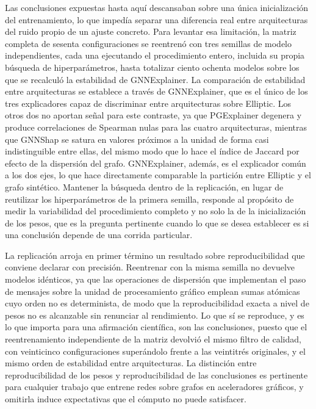 Las conclusiones expuestas hasta aquí descansaban sobre una única inicialización del entrenamiento, lo que impedía separar una diferencia real entre arquitecturas del ruido propio de un ajuste concreto. Para levantar esa limitación, la matriz completa de sesenta configuraciones se reentrenó con tres semillas de modelo independientes, cada una ejecutando el procedimiento entero, incluida su propia búsqueda de hiperparámetros, hasta totalizar ciento ochenta modelos sobre los que se recalculó la estabilidad de GNNExplainer. La comparación de estabilidad entre arquitecturas se establece a través de GNNExplainer, que es el único de los tres explicadores capaz de discriminar entre arquitecturas sobre Elliptic. Los otros dos no aportan señal para este contraste, ya que PGExplainer degenera y produce correlaciones de Spearman nulas para las cuatro arquitecturas, mientras que GNNShap se satura en valores próximos a la unidad de forma casi indistinguible entre ellas, del mismo modo que lo hace el índice de Jaccard por efecto de la dispersión del grafo. GNNExplainer, además, es el explicador común a los dos ejes, lo que hace directamente comparable la partición entre Elliptic y el grafo sintético. Mantener la búsqueda dentro de la replicación, en lugar de reutilizar los hiperparámetros de la primera semilla, responde al propósito de medir la variabilidad del procedimiento completo y no solo la de la inicialización de los pesos, que es la pregunta pertinente cuando lo que se desea establecer es si una conclusión depende de una corrida particular.

La replicación arroja en primer término un resultado sobre reproducibilidad que conviene declarar con precisión. Reentrenar con la misma semilla no devuelve modelos idénticos, ya que las operaciones de dispersión que implementan el paso de mensajes sobre la unidad de procesamiento gráfico emplean sumas atómicas cuyo orden no es determinista, de modo que la reproducibilidad exacta a nivel de pesos no es alcanzable sin renunciar al rendimiento. Lo que sí se reproduce, y es lo que importa para una afirmación científica, son las conclusiones, puesto que el reentrenamiento independiente de la matriz devolvió el mismo filtro de calidad, con veinticinco configuraciones superándolo frente a las veintitrés originales, y el mismo orden de estabilidad entre arquitecturas. La distinción entre reproducibilidad de los pesos y reproducibilidad de las conclusiones es pertinente para cualquier trabajo que entrene redes sobre grafos en aceleradores gráficos, y omitirla induce expectativas que el cómputo no puede satisfacer.

